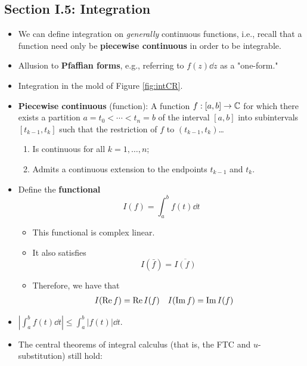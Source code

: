 \documentclass[../notes.tex]{subfiles}
\begin{document}
\subsection*{Section I.5: Integration}
\begin{itemize}
    \item {}We can define integration on \emph{generally} continuous functions, i.e., recall that a function need only be \textbf{piecewise continuous} in order to be integrable.
    \item Allusion to \textbf{Pfaffian forms}, e.g., referring to $f(z)\dd{z}$ as a "one-form."
    \item Integration in the mold of Figure \ref{fig:intCR}.
    \item \textbf{Piecewise continuous} (function): A function $f:[a,b]\to\mathbb{C}$ for which there exists a partition $a=t_0<\cdots<t_n=b$ of the interval $[a,b]$ into subintervals $[t_{k-1},t_k]$ such that the restriction of $f$ to $(t_{k-1},t_k)$\dots
    \begin{enumerate}
        \item Is continuous for all $k=1,\dots,n$;
        \item Admits a continuous extension to the endpoints $t_{k-1}$ and $t_k$.
    \end{enumerate}
    \item Define the \textbf{functional}
    \begin{equation*}
        I(f) = \int_a^bf(t)\dd{t}
    \end{equation*}
    \begin{itemize}
        \item This functional is complex linear.
        \item It also satisfies
        \begin{equation*}
            I(\bar{f}) = \overline{I(f)}
        \end{equation*}
        \item Therefore, we have that
        \begin{align*}
            I(\operatorname{Re} f) &= \operatorname{Re} I(f)&
            I(\operatorname{Im} f) &= \operatorname{Im} I(f)
        \end{align*}
    \end{itemize}
    \item $|\int_a^bf(t)\dd{t}|\leq\int_a^b|f(t)|\dd{t}$.
    \item The central theorems of integral calculus (that is, the FTC and $u$-substitution) still hold:
    \begin{itemize}

\end{itemize}
\end{itemize}
\end{document}
